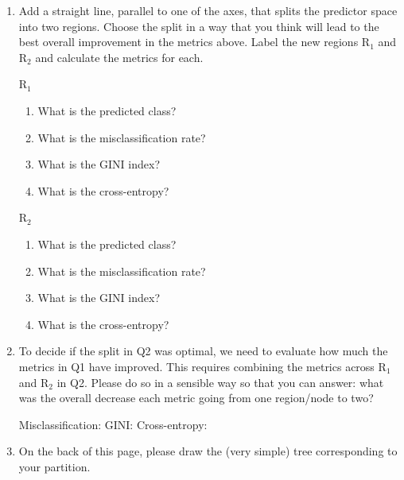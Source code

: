 \documentclass{article}\usepackage[]{graphicx}\usepackage[]{color}
\begin{document}
\begin{enumerate}
\item Add a straight line, parallel to one of the axes, that splits the predictor space into two regions. Choose the split in a way that you think will lead to the best overall improvement in the metrics above. Label the new regions $\textrm{R}_1$ and $\textrm{R}_2$ and calculate the metrics for each.

\vspace{5mm}

\begin{minipage}{.5\linewidth}
\begin{center}
$\textrm{R}_1$
\end{center}
\begin{enumerate}
\setlength\itemsep{3em}
\item What is the predicted class?
\item What is the misclassification rate?
\item What is the GINI index?
\item What is the cross-entropy?
\end{enumerate}
\end{minipage}
\begin{minipage}{.5\linewidth}
\begin{center}
$\textrm{R}_2$
\end{center}
\begin{enumerate}
\setlength\itemsep{3em}
\item What is the predicted class?
\item What is the misclassification rate?
\item What is the GINI index?
\item What is the cross-entropy?
\end{enumerate}

\end{minipage}
\item To decide if the split in Q2 was optimal, we need to evaluate how much the metrics in Q1 have improved. This requires combining the metrics across $\textrm{R}_1$ and $\textrm{R}_2$ in Q2. Please do so in a sensible way so that you can answer: what was the overall decrease each metric going from one region/node to two?

Misclassification: \hspace{30mm} GINI: \hspace{30mm} Cross-entropy:

\vspace{5mm}

\item On the back of this page, please draw the (very simple) tree corresponding to your partition.

\end{enumerate}
\end{document}
